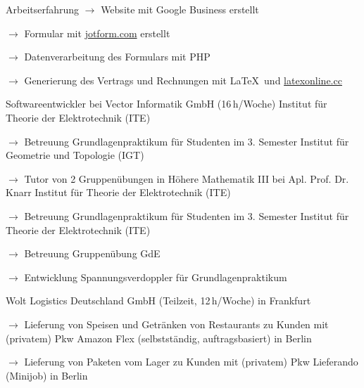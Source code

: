 \begin{rubric}{\textcolor{black!20!blue!100}{Arbeitserfahrung}}
			\setlength{\hangindent}{\widthof{$\rightarrow$ }}
			$\rightarrow$ Website mit Google Business erstellt

			$\rightarrow$ Formular mit \href{https://www.jotform.com/}{jotform.com} erstellt

			$\rightarrow$ Datenverarbeitung des Formulars mit PHP

			$\rightarrow$ Generierung des Vertrags und Rechnungen mit \LaTeX\ und \href{https://latexonline.cc/}{latexonline.cc}
			
		\entry*[05/2016 --- 10/2017]
			Softwareentwickler bei Vector Informatik GmbH (16\,h/Woche)
		\entry*[10/2015 --- 03/2016]
			Institut für Theorie der Elektrotechnik (ITE)
				
			\setlength{\hangindent}{\widthof{$\rightarrow$ }}
			$\rightarrow$ Betreuung Grundlagenpraktikum für Studenten im 3. Semester
		\entry*
			Institut für Geometrie und Topologie (IGT)
			
			\setlength{\hangindent}{\widthof{$\rightarrow$ }}
			$\rightarrow$ Tutor von 2 Gruppenübungen in Höhere Mathematik III bei Apl. Prof. Dr. Knarr
		\entry*[10/2014 --- 03/2015]
			Institut für Theorie der Elektrotechnik (ITE)
			
			\setlength{\hangindent}{\widthof{$\rightarrow$ }}
			$\rightarrow$ Betreuung Grundlagenpraktikum für Studenten im 3. Semester
		\entry*[10/2013 --- 03/2014]
			Institut für Theorie der Elektrotechnik (ITE)
			
			\setlength{\hangindent}{\widthof{$\rightarrow$ }}
			$\rightarrow$ Betreuung Gruppenübung GdE
			
			$\rightarrow$ Entwicklung Spannungsverdoppler für Grundlagenpraktikum
	
		\entry*[06/03/2024 --- 05/03/2025]
			Wolt Logistics Deutschland GmbH (Teilzeit, 12\,h/Woche) in Frankfurt
			
			\setlength{\hangindent}{\widthof{$\rightarrow$ }}
			$\rightarrow$ Lieferung von Speisen und Getränken von Restaurants zu Kunden mit (privatem) Pkw
		\entry*[09/11/2020 --- 06/2022]
			Amazon Flex (selbstständig, auftragsbasiert) in Berlin
			
			\setlength{\hangindent}{\widthof{$\rightarrow$ }}
			$\rightarrow$ Lieferung von Paketen vom Lager zu Kunden mit (privatem) Pkw
		\entry*[24/10/2020 --- 04/01/2021]
			Lieferando (Minijob) in Berlin
			

\end{rubric}
